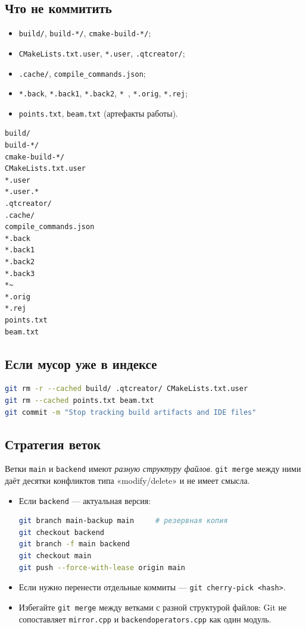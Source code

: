 \documentclass[a4paper,11pt]{article}
\newcommand{\file}[1]{\texttt{#1}}
\newcommand{\code}[1]{\texttt{#1}}
\begin{document}
\subsection{Что не коммитить}

\begin{itemize}[leftmargin=*]
    \item \file{build/}, \file{build-*/}, \file{cmake-build-*/};
    \item \file{CMakeLists.txt.user}, \file{*.user}, \file{.qtcreator/};
    \item \file{.cache/}, \file{compile\_commands.json};
    \item \file{*.back}, \file{*.back1}, \file{*.back2}, \file{*~},
          \file{*.orig}, \file{*.rej};
    \item \file{points.txt}, \file{beam.txt} (артефакты работы).
\end{itemize}

\begin{lstlisting}[language=bash,caption={.gitignore}]
build/
build-*/
cmake-build-*/
CMakeLists.txt.user
*.user
*.user.*
.qtcreator/
.cache/
compile_commands.json
*.back
*.back1
*.back2
*.back3
*~
*.orig
*.rej
points.txt
beam.txt
\end{lstlisting}

\subsection{Если мусор уже в индексе}

\begin{lstlisting}[language=bash]
git rm -r --cached build/ .qtcreator/ CMakeLists.txt.user
git rm --cached points.txt beam.txt
git commit -m "Stop tracking build artifacts and IDE files"
\end{lstlisting}

\subsection{Стратегия веток}

Ветки \code{main} и \code{backend} имеют \emph{разную структуру файлов}.
\code{git merge} между ними даёт десятки конфликтов типа
«modify/delete» и не имеет смысла.

\begin{itemize}[leftmargin=*]
    \item Если \code{backend} — актуальная версия:
\begin{lstlisting}[language=bash]
git branch main-backup main     # резервная копия
git checkout backend
git branch -f main backend
git checkout main
git push --force-with-lease origin main
\end{lstlisting}
    \item Если нужно перенести отдельные коммиты —
          \code{git cherry-pick <hash>}.
    \item Избегайте \code{git merge} между ветками с разной структурой
          файлов: Git не сопоставляет \file{mirror.cpp} и
          \file{backendoperators.cpp} как один модуль.
\end{itemize}
\end{document}
